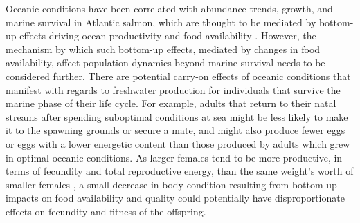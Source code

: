 \documentclass[12pt]{article}
\begin{document}
Oceanic conditions have been correlated with abundance trends, growth, and
marine survival in Atlantic salmon, which are thought to be mediated by
bottom-up effects driving ocean productivity and food availability
\citep{Todd2008, Renkawitz2015,Olmos2020}.
However, the mechanism by which such bottom-up effects, mediated by changes in
food availability, affect population dynamics beyond marine survival needs to
be considered further.
There are potential carry-on effects of oceanic conditions that manifest with
regards to freshwater production for individuals that survive the marine phase
of their life cycle.
For example, adults that return to their natal streams after spending
suboptimal conditions at sea might be less likely to make it to the spawning
grounds or secure a mate, and might also produce fewer eggs or eggs with a
lower energetic content than those produced by adults which grew in optimal
oceanic conditions.
As larger females tend to be more productive, in terms of fecundity and total
reproductive energy, than the same weight's worth of smaller females
\citep{Barneche2018}, a small decrease in body condition resulting from bottom-up
impacts on food availability and quality could potentially have
disproportionate effects on fecundity and fitness of the offspring.

\end{document}
